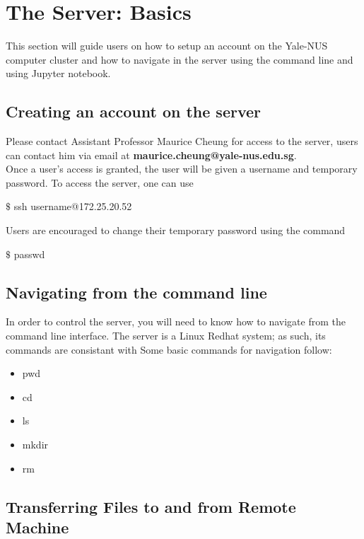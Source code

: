 \chapter{The Server: Basics}

This section will guide users on how to setup an account on the Yale-NUS computer cluster and how to navigate in the server using the command line and using Jupyter notebook. 

\section{Creating an account on the server}

Please contact Assistant Professor Maurice Cheung for access to the server, users can contact him via email at \textbf{maurice.cheung@yale-nus.edu.sg}. \\

Once a user's access is granted, the user will be given a username and temporary password. To access the server, one can use

\begin{framed}
$\$$ ssh username@172.25.20.52
\end{framed}

Users are encouraged to change their temporary password using the command

\begin{framed}
$\$$ passwd
\end{framed}

\section{Navigating from the command line}
In order to control the server, you will need to know how to navigate from the command line interface. The server is a Linux Redhat system; as such, its commands are consistant with Some basic commands for navigation follow:
\begin{itemize}
\item pwd
\item cd
\item ls
\item mkdir
\item rm
\end{itemize}

\section{Transferring Files to and from Remote Machine}

